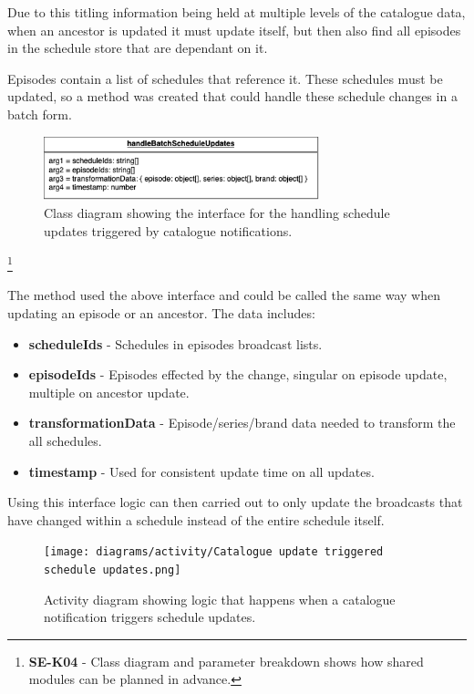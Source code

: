   Due to this titling information being held at multiple levels of the catalogue data, when an ancestor is updated it must update itself,
  but then also find all episodes in the schedule store that are dependant on it.

  Episodes contain a list of schedules that reference it. These schedules must be updated, so a method was created that could handle these
  schedule changes in a batch form.

  \begin{figure}[H]
    \centering
    \includegraphics[width=8cm]{assets/handleBatchScheduleInterface.drawio.png}
    \caption{Class diagram showing the interface for the handling schedule updates triggered by catalogue notifications.}
    \label{fig:catalogueTriggeredScheduleUpdateClass}
  \end{figure}

  \footnote{\textbf{SE-K04} - Class diagram and parameter breakdown shows how shared modules can be planned in advance.}

  The method used the above interface and could be called the same way when updating an episode or an ancestor. The data includes:
  \begin{itemize}
    \item \textbf{scheduleIds} - Schedules in episodes broadcast lists.
    \item \textbf{episodeIds} - Episodes effected by the change, singular on episode update, multiple on ancestor update.
    \item \textbf{transformationData} - Episode/series/brand data needed to transform the all schedules.
    \item \textbf{timestamp} - Used for consistent update time on all updates.
  \end{itemize}

  Using this interface logic can then carried out to only update the broadcasts that have changed within a schedule instead of the 
  entire schedule itself.

  \begin{figure}[H]
    \centering
    \texttt{[image: diagrams/activity/Catalogue update triggered schedule updates.png]}
    \caption{Activity diagram showing logic that happens when a catalogue notification triggers schedule updates.}
    \label{fig:catalogueTriggeredScheduleUpdateActivity}
  \end{figure}

